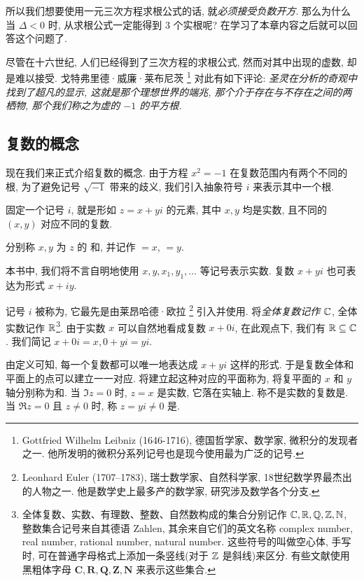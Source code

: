 所以我们想要使用一元三次方程求根公式的话, 就\emph{必须接受负数开方}.
那么为什么当 $\Delta<0$ 时, 从求根公式一定能得到 $3$ 个实根呢?
在学习了本章内容之后就可以回答这个问题了.

尽管在十六世纪, 人们已经得到了三次方程的求根公式, 然而对其中出现的虚数, 却是难以接受.
戈特弗里德·威廉·莱布尼茨%
  \footnote{%
    Gottfried Wilhelm Leibniz (1646-1716), 德国哲学家、数学家, 微积分的发现者之一. 他所发明的微积分系列记号也是现今使用最为广泛的记号.
  }%
对此有如下评论: \emph{圣灵在分析的奇观中找到了超凡的显示, 这就是那个理想世界的端兆, 那个介于存在与不存在之间的两栖物, 那个我们称之为虚的 $-1$ 的平方根.}



\subsection{复数的概念}

现在我们来正式介绍复数的概念.
由于方程 $x^2=-1$ 在复数范围内有两个不同的根, 为了避免记号 $\sqrt{-1}$ 带来的歧义, 我们引入抽象符号 $i$ 来表示其中一个根.

\begin{definition}
  固定一个记号 $i$, 就是形如 $z=x+yi$ 的元素, 其中 $x,y$ 均是实数, 且不同的 $(x,y)$ 对应不同的复数.

  分别称 $x,y$ 为 $z$ 的 和, 并记作 ${}=x$, ${}=y$.
\end{definition}

本书中, 我们将不言自明地使用 $x,y,x_1,y_1,\dots$ 等记号表示实数.
复数 $x+yi$ 也可表达为形式 $x+iy$.

记号 $i$ 被称为, 它最先是由莱昂哈德·欧拉%
  \footnote{%
    Leonhard Euler (1707--1783), 瑞士数学家、自然科学家, 18世纪数学界最杰出的人物之一. 他是数学史上最多产的数学家, 研究涉及数学各个分支.
  }%
引入并使用.
将\emph{全体复数记作 ${\mathbb{C}}$}, 全体实数记作 ${\mathbb{R}}$\footnote{%
  全体复数、实数、有理数、整数、自然数构成的集合分别记作 ${\mathbb{C}},{\mathbb{R}},{\mathbb{Q}},{\mathbb{Z}},{\mathbb{N}}$, 整数集合记号来自其德语 Zahlen, 其余来自它们的英文名称 complex number, real number, rational number, natural number.
  这些符号的叫做空心体, 手写时, 可在普通字母格式上添加一条竖线(对于 ${\mathbb{Z}}$ 是斜线)来区分.
  有些文献使用黑粗体字母 $\mathbf{C,R,Q,Z,N}$ 来表示这些集合.
}.
由于实数 $x$ 可以自然地看成复数 $x+0i$, 在此观点下, 我们有 ${\mathbb{R}}\subseteq {\mathbb{C}}$.
我们简记 $x+0i=x,0+yi=yi$.

由定义可知, 每一个复数都可以唯一地表达成 $x+yi$ 这样的形式.
于是复数全体和平面上的点可以建立一一对应.
将建立起这种对应的平面称为, 将复平面的 $x$ 和 $y$ 轴分别称为和.
当 $\Im z=0$ 时, $z=x$ 是实数, 它落在实轴上.
称不是实数的复数是.
当 $\Re z=0$ 且 $z\neq 0$ 时, 称 $z=yi\neq 0$ 是.


